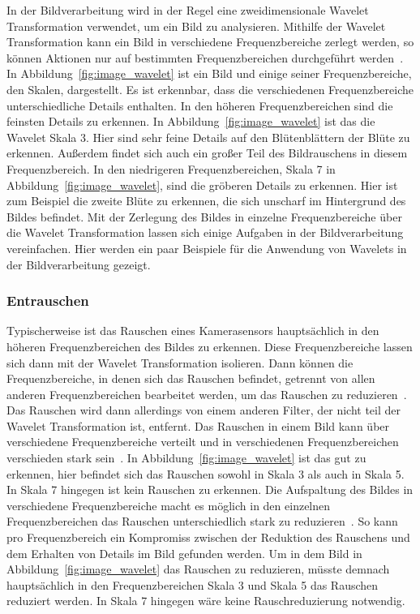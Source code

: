 \documentclass[12pt, a4paper, ngerman]{article}
\begin{document}
In der Bildverarbeitung wird in der Regel eine zweidimensionale Wavelet Transformation verwendet,
um ein Bild zu analysieren.
Mithilfe der Wavelet Transformation kann ein Bild in verschiedene Frequenzbereiche zerlegt werden,
so können Aktionen nur auf bestimmten Frequenzbereichen durchgeführt werden~\cite[S.38]{dt_manual}.
In Abbildung~\ref{fig:image_wavelet} ist ein Bild 
und einige seiner Frequenzbereiche, den Skalen, dargestellt.
Es ist erkennbar, dass die verschiedenen Frequenzbereiche unterschiedliche Details enthalten.
In den höheren Frequenzbereichen sind die feinsten Details zu erkennen.
In Abbildung~\ref{fig:image_wavelet} ist das die Wavelet Skala 3. 
Hier sind sehr feine Details auf den Blütenblättern der Blüte zu erkennen.
Außerdem findet sich auch ein großer Teil des Bildrauschens in diesem Frequenzbereich.
In den niedrigeren Frequenzbereichen, Skala 7 in Abbildung~\ref{fig:image_wavelet},
sind die gröberen Details zu erkennen.
Hier ist zum Beispiel die zweite Blüte zu erkennen, 
die sich unscharf im Hintergrund des Bildes befindet.
Mit der Zerlegung des Bildes in einzelne Frequenzbereiche über die Wavelet Transformation
lassen sich einige Aufgaben in der Bildverarbeitung vereinfachen.
Hier werden ein paar Beispiele für die Anwendung von Wavelets in der Bildverarbeitung gezeigt.

\subsubsection{Entrauschen}

Typischerweise ist das Rauschen eines Kamerasensors
hauptsächlich in den höheren Frequenzbereichen des Bildes zu erkennen.
Diese Frequenzbereiche lassen sich dann mit der Wavelet Transformation isolieren.
Dann können die Frequenzbereiche, in denen sich das Rauschen befindet,
getrennt von allen anderen Frequenzbereichen bearbeitet werden,
um das Rauschen zu reduzieren~\cite[S.117]{dt_manual}.
Das Rauschen wird dann allerdings von einem anderen Filter,
der nicht teil der Wavelet Transformation ist, entfernt.
Das Rauschen in einem Bild kann über verschiedene Frequenzbereiche verteilt
und in verschiedenen Frequenzbereichen verschieden stark sein~\cite[S.119]{dt_manual}.
In Abbildung~\ref{fig:image_wavelet} ist das gut zu erkennen,
hier befindet sich das Rauschen sowohl in Skala 3 als auch in Skala 5.
In Skala 7 hingegen ist kein Rauschen zu erkennen.
Die Aufspaltung des Bildes in verschiedene Frequenzbereiche
macht es möglich in den einzelnen Frequenzbereichen
das Rauschen unterschiedlich stark zu reduzieren~\cite[S.119]{dt_manual}.
So kann pro Frequenzbereich ein Kompromiss zwischen der Reduktion des Rauschens
und dem Erhalten von Details im Bild gefunden werden.
Um in dem Bild in Abbildung~\ref{fig:image_wavelet} das Rauschen zu reduzieren,
müsste demnach hauptsächlich in den Frequenzbereichen Skala 3 und Skala 5
das Rauschen reduziert werden. 
In Skala 7 hingegen wäre keine Rauschreduzierung notwendig.
\end{document}
